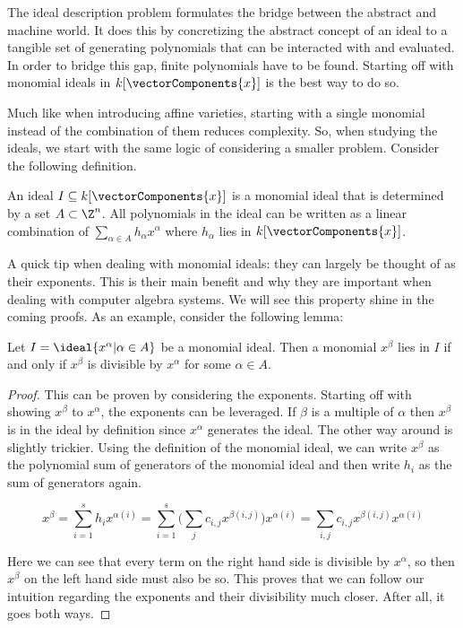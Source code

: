 The ideal description problem formulates the bridge between the abstract and machine world. It does this by concretizing the abstract concept of an ideal to a tangible set of generating polynomials that can be interacted with and evaluated. In order to bridge this gap, finite polynomials have to be found. Starting off with monomial ideals in $k[\vectorComponents{x}]$ is the best way to do so. 

Much like when introducing affine varieties, starting with a single monomial instead of the combination of them reduces complexity. So, when studying the ideals, we start with the same logic of considering a smaller problem. Consider the following definition.

\begin{definition}
    An ideal $I \subseteq k[\vectorComponents{x}]$ is a monomial ideal that is determined by a set $A \subset \Z^n$. All polynomials in the ideal can be written as a linear combination of $\sum_{\alpha \in A} h_\alpha x^\alpha$ where $h_\alpha$ lies in $k[\vectorComponents{x}]$. 
\end{definition}

A quick tip when dealing with monomial ideals: they can largely be thought of as their exponents. This is their main benefit and why they are important when dealing with computer algebra systems. We will see this property shine in the coming proofs. As an example, consider the following lemma:

 \begin{lemma}
    Let $ I = \ideal{x^\alpha | \alpha \in A}$ be a monomial ideal. Then a monomial $x^\beta$ lies in $I$ if and only if $x^\beta$ is divisible by $x^\alpha$ for some $\alpha \in A$. 
 \end{lemma}

 \begin{proof}
    This can be proven by considering the exponents. Starting off with showing $x^\beta$ to $x^\alpha$, the exponents can be leveraged. If $\beta$ is a multiple of $\alpha$ then $x^\beta$ is in the ideal by definition since $x^\alpha$ generates the ideal. The other way around is slightly trickier. Using the definition of the monomial ideal, we can write $x^\beta$ as the polynomial sum of generators of the monomial ideal and then write $ h_i$ as the sum of generators again.
     
 \begin{equation}
    x^\beta = \sum_{i = 1}^{s} h_i x^{\alpha(i)} = \sum_{i = 1}^{s}\bigg(\sum_{j}c_{i,j}x^{\beta (i,j)}\bigg)x^{\alpha(i)} = \sum_{i,j} c_{i,j}x^{\beta (i,j)}x^{\alpha(i)}
 \end{equation}

 Here we can see that every term on the right hand side is divisible by $x^\alpha$, so then $x^\beta$ on the left hand side must also be so. This proves that we can follow our intuition regarding the exponents and their divisibility much closer. After all, it goes both ways.

 \end{proof}

